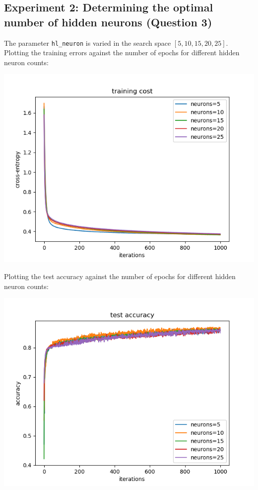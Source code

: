 \subsection*{Experiment 2: Determining the optimal number of hidden neurons
(Question 3)}

The parameter \texttt{hl\_neuron} is varied in the search space
\([5,10,15,20,25]\).
Plotting the training errors against the number of epochs for different hidden
neuron counts:

\begin{center}
    \includegraphics[width=\imgw]{images/p1a3_neuron_cost.png}   
\end{center}

Plotting the test accuracy against the number of epochs for different hidden
neuron counts:

\begin{center}
    \includegraphics[width=\imgw]{images/p1a3_neuron_accuracy.png}   
\end{center}

